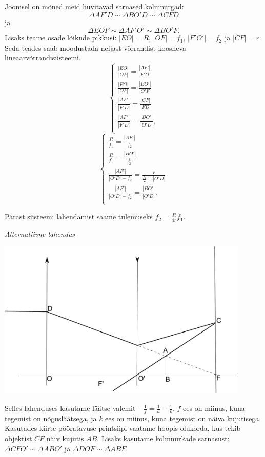 \documentclass[11pt]{article}
\begin{document}
{{Joonisel on mõned meid huvitavad sarnased kolmnurgad: $$\Delta AF'D \sim \Delta BO'D \sim \Delta CFD$$ ja $$\Delta EOF \sim \Delta AF'O' \sim \Delta BO'F.$$ Lisaks teame osade lõikude pikkusi: $|EO| = R$, $|OF| = f_1$, $|F'O'| = f_2$ ja $|CF| = r$.
Seda teades saab moodustada neljast võrrandist koosneva lineaarvõrrandisüsteemi.
\[ 
\begin{cases}
\frac{|EO|}{|OF|} = \frac{|AF'|}{F'O}\\
\frac{|EO|}{|OF|} = \frac{|BO'|}{O'F}\\
\frac{|AF'|}{|F'D|} = \frac{|CF|}{|FD|}\\
\frac{|AF'|}{|F'D|} = \frac{|BO'|}{|O'D|},\\
\end{cases}
\]
\[ 
\begin{cases}
\frac{R}{f_1} = \frac{|AF'|}{f_2}\\
\frac{R}{f_1} = \frac{|BO'|}{\frac{f_1}{2}}\\
\frac{|AF'|}{|O'D| - f_2} = \frac{r}{\frac{f_1}{2} + |O'D|}\\
\frac{|AF'|}{|O'D| - f_2} = \frac{|BO'|}{|O'D|}.\\
\end{cases}
\]

Pärast süsteemi lahendamist saame tulemuseks $f_2 = \frac{R}{4r}f_1$. 

\vspace{0.5\baselineskip}
\emph{Alternatiivne lahendus}\\

\begin{center}
	\includegraphics[width=0.9\textwidth]{2013-v3g-01-laats_lah3}\\
\end{center}

Selles lahenduses kasutame läätse valemit $-\frac{1}{f} = \frac{1}{a} - \frac{1}{k}$. $f$ ees on miinus, kuna tegemist on nõgusläätsega, ja $k$ ees on miinus, kuna tegemist on näiva kujutisega. Kasutades kiirte pööratavuse printsiipi vaatame hoopis olukorda, kus tekib objektist $CF$ näiv kujutis $AB$. Lisaks kasutame kolmnurkade sarnasust: $\Delta CFO' \sim \Delta ABO'$ ja $\Delta DOF \sim \Delta ABF$.

}}
\end{document}
